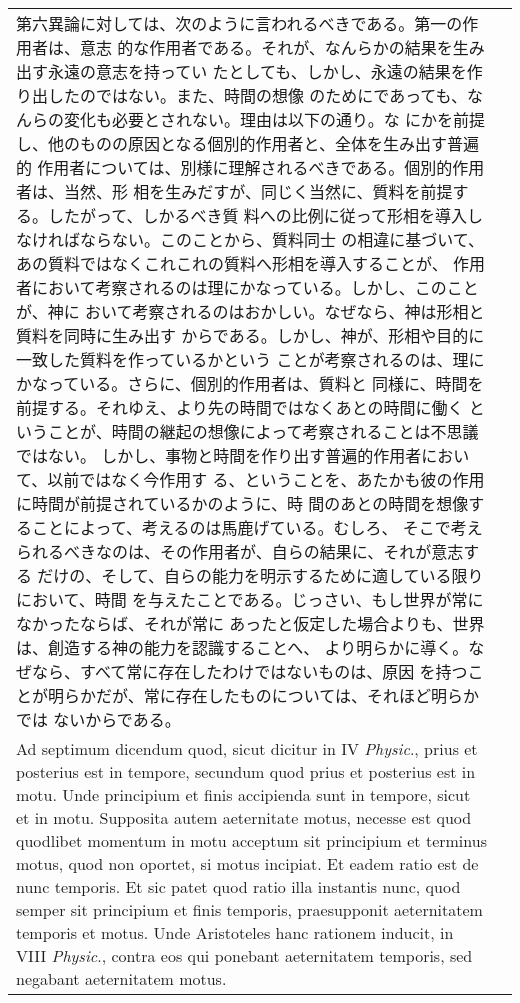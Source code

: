 \documentclass[10pt]{jsarticle} %
\begin{document}
\begin{longtable}{p{21em}p{21em}}
第六異論に対しては、次のように言われるべきである。第一の作用者は、意志
的な作用者である。それが、なんらかの結果を生み出す永遠の意志を持ってい
たとしても、しかし、永遠の結果を作り出したのではない。また、時間の想像
のためにであっても、なんらの変化も必要とされない。理由は以下の通り。な
にかを前提し、他のものの原因となる個別的作用者と、全体を生み出す普遍的
作用者については、別様に理解されるべきである。個別的作用者は、当然、形
相を生みだすが、同じく当然に、質料を前提する。したがって、しかるべき質
料への比例に従って形相を導入しなければならない。このことから、質料同士
の相違に基づいて、あの質料ではなくこれこれの質料へ形相を導入することが、
作用者において考察されるのは理にかなっている。しかし、このことが、神に
おいて考察されるのはおかしい。なぜなら、神は形相と質料を同時に生み出す
からである。しかし、神が、形相や目的に一致した質料を作っているかという
ことが考察されるのは、理にかなっている。さらに、個別的作用者は、質料と
同様に、時間を前提する。それゆえ、より先の時間ではなくあとの時間に働く
ということが、時間の継起の想像によって考察されることは不思議ではない。
しかし、事物と時間を作り出す普遍的作用者において、以前ではなく今作用す
る、ということを、あたかも彼の作用に時間が前提されているかのように、時
間のあとの時間を想像することによって、考えるのは馬鹿げている。むしろ、
そこで考えられるべきなのは、その作用者が、自らの結果に、それが意志する
だけの、そして、自らの能力を明示するために適している限りにおいて、時間
を与えたことである。じっさい、もし世界が常になかったならば、それが常に
あったと仮定した場合よりも、世界は、創造する神の能力を認識することへ、
より明らかに導く。なぜなら、すべて常に存在したわけではないものは、原因
を持つことが明らかだが、常に存在したものについては、それほど明らかでは
ないからである。

\\



{\sc Ad septimum dicendum} quod, sicut dicitur in IV {\it Physic}., prius et
 posterius est in tempore, secundum quod prius et posterius est in
 motu. Unde principium et finis accipienda sunt in tempore, sicut et in
 motu. Supposita autem aeternitate motus, necesse est quod quodlibet
 momentum in motu acceptum sit principium et terminus motus, quod non
 oportet, si motus incipiat. Et eadem ratio est de nunc temporis. Et sic
 patet quod ratio illa instantis nunc, quod semper sit principium et
 finis temporis, praesupponit aeternitatem temporis et motus. Unde
 Aristoteles hanc rationem inducit, in VIII {\it Physic}., contra eos qui
 ponebant aeternitatem temporis, sed negabant aeternitatem motus.


\end{longtable}
\end{document}
